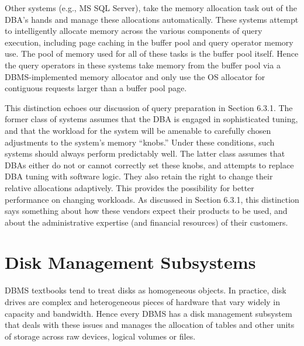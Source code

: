 \documentclass[b5paper,11pt,twoside,openright]{book}
\begin{document}
Other systems (e.g., MS SQL Server), take the memory allocation task out
of the DBA's hands and manage these allocations automatically. These
systems attempt to intelligently allocate memory across the various
components of query execution, including page caching in the buffer pool
and query operator memory use. The pool of memory used for all of these
tasks is the buffer pool itself. Hence the query operators in these
systems take memory from the buffer pool via a DBMS-implemented memory
allocator and only use the OS allocator for contiguous requests larger
than a buffer pool page.

This distinction echoes our discussion of query preparation in Section
6.3.1. The former class of systems assumes that the DBA is engaged in
sophisticated tuning, and that the workload for the system will be
amenable to carefully chosen adjustments to the system's memory
``knobs.'' Under these conditions, such systems should always perform
predictably well. The latter class assumes that DBAs either do not or
cannot correctly set these knobs, and attempts to replace DBA tuning
with software logic. They also retain the right to change their relative
allocations adaptively. This provides the possibility for better
performance on changing workloads. As discussed in Section 6.3.1, this
distinction says something about how these vendors expect their products
to be used, and about the administrative expertise (and financial
resources) of their customers.

\hypertarget{disk-management-subsystems}{%
\section{Disk Management
Subsystems}\label{disk-management-subsystems}}

DBMS textbooks tend to treat disks as homogeneous objects. In practice,
disk drives are complex and heterogeneous pieces of hardware that vary
widely in capacity and bandwidth. Hence every DBMS has a disk management
subsystem that deals with these issues and manages the allocation of
tables and other units of storage across raw devices, logical volumes or
files.
\end{document}
